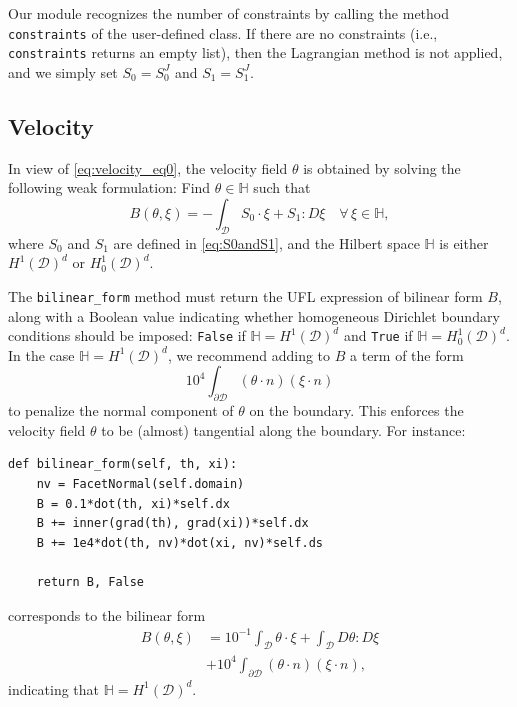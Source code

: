 \documentclass[iicol,pdflatex,sn-mathphys-ay]{sn-jnl}%
\theoremstyle{thmstyleone}%
\theoremstyle{thmstyletwo}%
\theoremstyle{thmstylethree}%
\begin{document}
Our module recognizes the number of constraints by calling
the method \texttt{constraints} of the user-defined class.
If there are no constraints (i.e., \texttt{constraints} returns an empty list),
then the Lagrangian method is not applied, and we simply set
$S_0 = S_0^J$ and $S_1 = S_1^J$.

\subsection{Velocity}\label{sub:velocity}

In view of \eqref{eq:velocity_eq0}, the velocity field $\theta$
is obtained by solving the following weak formulation:
Find $\theta\in\mathbb{H}$ such that
\begin{equation} \label{eq:velocity}
	B (\theta,\xi) =
	-\int_{\mathcal{D}} S_0 \cdot \xi + S_1 \colon\! D\xi
	\quad\forall\,\xi\in\mathbb{H},
\end{equation}
where $S_0$ and $S_1$ are defined in \eqref{eq:S0andS1}, and
the Hilbert space $\mathbb{H}$ is either
$H^1(\mathcal{D})^d$ or $H_0^1(\mathcal{D})^d$.

The \texttt{bilinear\_form} method must return 
the UFL expression of bilinear form $B$, along with
a Boolean value indicating whether homogeneous Dirichlet boundary conditions
should be imposed:
\texttt{False} if $\mathbb{H} = H^1(\mathcal{D})^d$ and
\texttt{True} if $\mathbb{H} = H_0^1(\mathcal{D})^d$.
In the case $\mathbb{H} = H^1(\mathcal{D})^d$,
we recommend adding to $B$ a term of the form
\begin{equation}\label{eq:bd_plt}
	{10}^4 \int_{\partial \mathcal{D}}  (\theta \cdot n) (\xi \cdot n)
\end{equation}
to penalize the normal component of $\theta$ on the boundary.
This enforces the velocity field $\theta$ to be
(almost) tangential along the boundary.
For instance:
\begin{lstlisting}
def bilinear_form(self, th, xi):
	nv = FacetNormal(self.domain)
	B = 0.1*dot(th, xi)*self.dx
	B += inner(grad(th), grad(xi))*self.dx
	B += 1e4*dot(th, nv)*dot(xi, nv)*self.ds

	return B, False	
\end{lstlisting}
corresponds to the bilinear form
\begin{equation*}
\begin{aligned}
	B(\theta,\xi) &=  {10}^{-1} \int_{\mathcal{D}} \theta \cdot \xi + 
	\int_{\mathcal{D}} D\theta \colon\! D\xi\\
	&+{10}^4 \int_{\partial \mathcal{D}} (\theta \cdot n) (\xi \cdot n),		
\end{aligned}
\end{equation*}
indicating that $\mathbb{H} = H^1(\mathcal{D})^d$.
\end{document}
